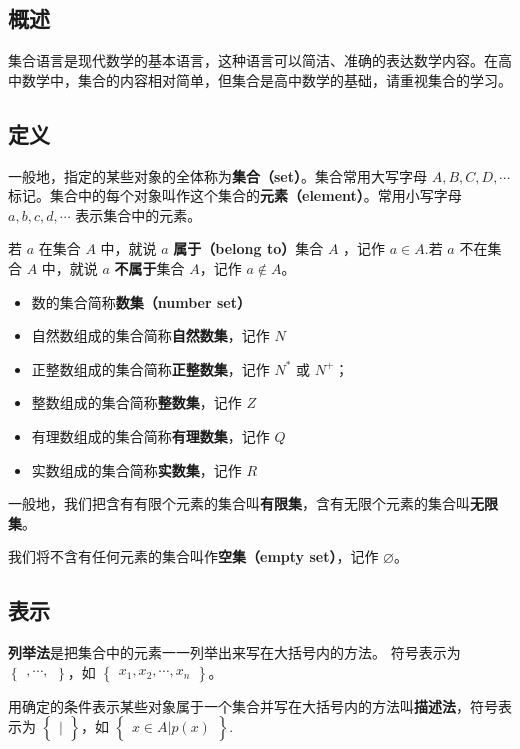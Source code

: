 
\subsection{概述}
集合语言是现代数学的基本语言，这种语言可以简洁、准确的表达数学内容。在高中数学中，集合的内容相对简单，但集合是高中数学的基础，请重视集合的学习。

\subsection{定义}
一般地，指定的某些对象的全体称为\textbf{集合（set）}。集合常用大写字母 $A,B,C,D,\cdots$ 标记。集合中的每个对象叫作这个集合的\textbf{元素（element）}。常用小写字母 $a,b,c,d,\cdots$ 表示集合中的元素。

若 $a$ 在集合 $A$ 中，就说 $a$ \textbf{属于（belong to）}集合 $A$ ，记作 $a \in A$.若 $a$ 不在集合 $A$ 中，就说 $a$ \textbf{不属于}集合 $A$，记作 $a\notin A$。

\begin{itemize}
\item 数的集合简称\textbf{数集（number set）}
\item 自然数组成的集合简称\textbf{自然数集}，记作 $N$
\item 正整数组成的集合简称\textbf{正整数集}，记作 $N^{*}$ 或 $N^{+}$； 
\item 整数组成的集合简称\textbf{整数集}，记作 $Z$
\item 有理数组成的集合简称\textbf{有理数集}，记作 $Q$
\item 实数组成的集合简称\textbf{实数集}，记作 $R$
\end{itemize}

一般地，我们把含有有限个元素的集合叫\textbf{有限集}，含有无限个元素的集合叫\textbf{无限集}。

我们将不含有任何元素的集合叫作\textbf{空集（empty set）}，记作 $\varnothing$。

\subsection{表示}
\textbf{列举法}是把集合中的元素一一列举出来写在大括号内的方法。
符号表示为 $\begin{Bmatrix} ,\cdots, \end{Bmatrix}$，如 $\begin{Bmatrix} x_1,x_2, \cdots ,x_n \end{Bmatrix}$。

用确定的条件表示某些对象属于一个集合并写在大括号内的方法叫\textbf{描述法}，符号表示为 $\begin{Bmatrix} | \end{Bmatrix}$，如 $\begin{Bmatrix} x\in A|p(x) \end{Bmatrix}$.

